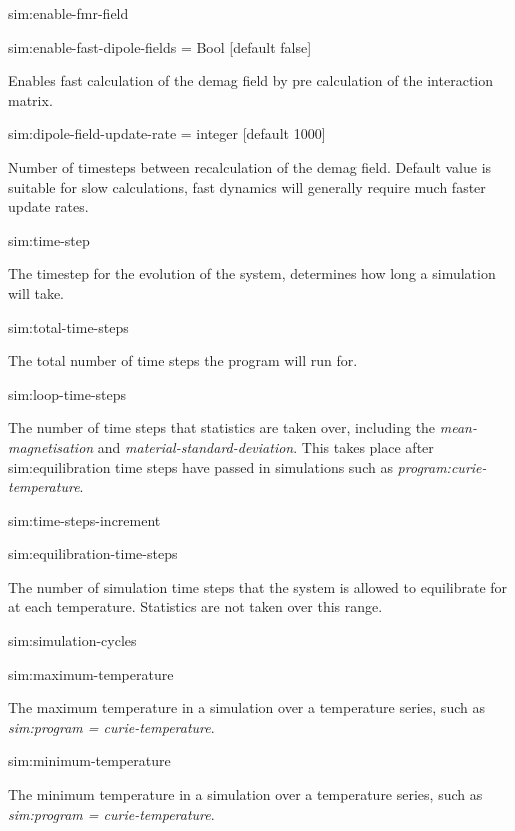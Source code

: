 {\zicf sim:enable-fmr-field}

{\zicf sim:enable-fast-dipole-fields = Bool [default false]} Enables fast calculation of the demag field by pre calculation of the interaction matrix.

{\zicf sim:dipole-field-update-rate = integer [default 1000]}
Number of timesteps between recalculation of the demag field. Default value is suitable for slow calculations, fast dynamics will generally require much faster update rates.

{\zicf sim:time-step} The timestep for the evolution of the system, determines how long a simulation will take.

{\zicf sim:total-time-steps} The total number of time steps the program will run for.

{\zicf sim:loop-time-steps} The number of time steps that statistics are taken over, including the \textit{mean-magnetisation} and \textit{material-standard-deviation}. This takes place after sim:equilibration time steps have passed in simulations such as \textit{program:curie-temperature}.

{\zicf sim:time-steps-increment}

{\zicf sim:equilibration-time-steps} The number of simulation time steps that the system is allowed to equilibrate for at each temperature. Statistics are not taken over this range.

{\zicf sim:simulation-cycles}

{\zicf sim:maximum-temperature} The maximum temperature in a simulation over a temperature series, such as \textit{sim:program = curie-temperature}.

{\zicf sim:minimum-temperature} The minimum temperature in a simulation over a temperature series, such as \textit{sim:program = curie-temperature}.

